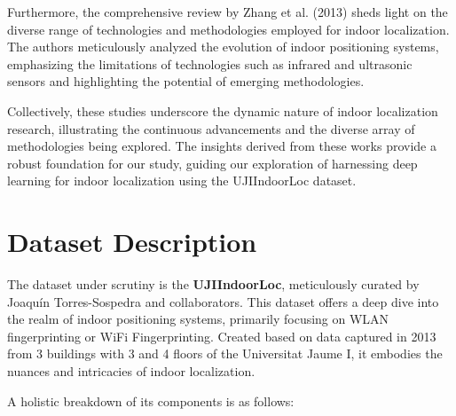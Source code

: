 \documentclass[conference]{IEEEtran}
\begin{document}
Furthermore, the comprehensive review by Zhang et al. (2013) sheds light on the diverse range of technologies and methodologies employed for indoor localization\textcolor{blue}{\cite{zhang2013comprehensive}}. The authors meticulously analyzed the evolution of indoor positioning systems, emphasizing the limitations of technologies such as infrared and ultrasonic sensors and highlighting the potential of emerging methodologies.

Collectively, these studies underscore the dynamic nature of indoor localization research, illustrating the continuous advancements and the diverse array of methodologies being explored. The insights derived from these works provide a robust foundation for our study, guiding our exploration of harnessing deep learning for indoor localization using the UJIIndoorLoc dataset.

\section{Dataset Description}

The dataset under scrutiny is the \textbf{UJIIndoorLoc}, meticulously curated by Joaquín Torres-Sospedra and collaborators\cite{UJIIndoorLocPap}. This dataset offers a deep dive into the realm of indoor positioning systems, primarily focusing on WLAN fingerprinting or WiFi Fingerprinting. Created based on data captured in 2013 from 3 buildings with 3 and 4 floors of the Universitat Jaume I, it embodies the nuances and intricacies of indoor localization.

A holistic breakdown of its components is as follows:
\end{document}
